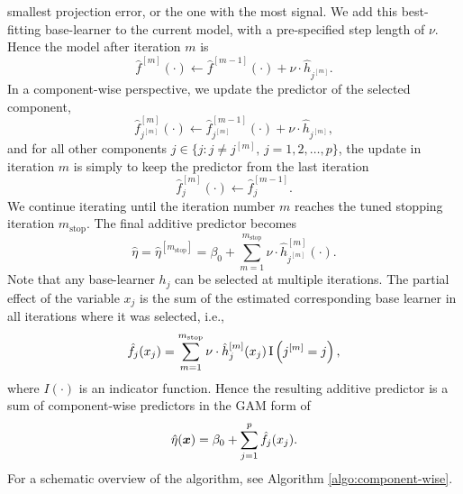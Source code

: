 smallest projection error, or the one with the most signal.
We add this best-fitting base-learner to the current model, with a pre-specified step length of $\nu$. Hence the model after iteration $m$ is
\begin{equation*}
    \hat{f}^{[m]}(\cdot)\gets \hat{f}^{[m-1]}(\cdot)+\nu\cdot\hat{h}_{j^{[m]}}.
\end{equation*}
In a component-wise perspective, we update the predictor of the selected component,
\begin{equation*}
    \hat{f}_{j^{[m]}}^{[m]}(\cdot)\gets \hat{f}_{j^{[m]}}^{[m-1]}(\cdot)+\nu\cdot\hat{h}_{j^{[m]}},
\end{equation*}
and for all other components $j\in\{j\colon j\neq j^{[m]},\,j=1,2,\ldots,p\}$, the update in iteration $m$ is simply
to keep the predictor from the last iteration
\begin{equation*}
    \hat{f}_{j}^{[m]}(\cdot)\gets \hat{f}_{j}^{[m-1]}.
\end{equation*}
We continue iterating until the iteration number $m$ reaches the tuned stopping iteration $m_{\text{stop}}$.
The final additive predictor becomes
\begin{equation*}
    \hat{\eta}=\hat{\eta}^{[m_{\text{stop}}]}=\beta_0 + \sum_{m=1}^{m_{\text{stop}}}\nu\cdot\hat{h}_{j^{[m]}}^{[m]}(\cdot).
\end{equation*}
Note that any base-learner $h_j$ can be selected at multiple iterations. The partial effect of the variable $x_j$ is the sum of the estimated corresponding base learner in all iterations where it was selected, i.e.,
\begin{equation*}
    \hat{f}_j(x_j)=\sum_{m=1}^{m_{\text{stop}}}\nu\cdot\hat{h}_j^{[m]}(x_j)\operatorname{I}\left(j^{[m]}=j\right),
\end{equation*}
where $I(\cdot)$ is an indicator function. Hence the resulting additive predictor is a sum of component-wise predictors in the GAM form of
\begin{equation*}
    \hat{\eta}(\bm{x})=\beta_0+\sum_{j=1}^p \hat{f}_j(x_j).
\end{equation*}
For a schematic overview of the algorithm, see Algorithm \ref{algo:component-wise}.
